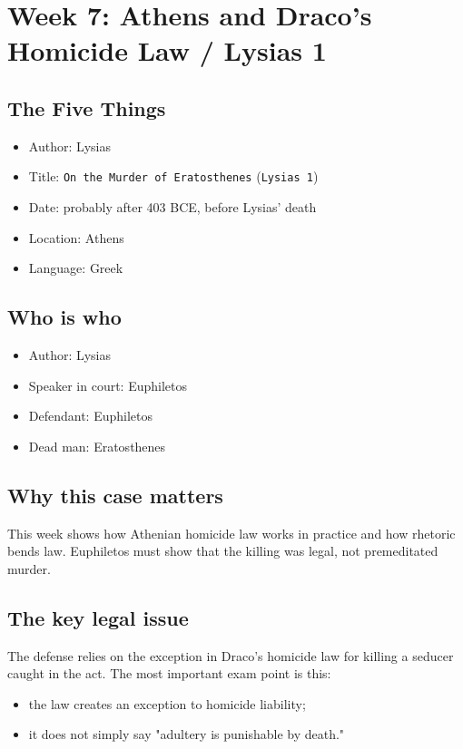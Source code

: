 \documentclass[11pt]{article}
\begin{document}
\section{Week 7: Athens and Draco's Homicide Law / Lysias 1}

\subsection{The Five Things}

\begin{itemize}
\item Author: Lysias
\item Title: \texttt{On the Murder of Eratosthenes} (\texttt{Lysias 1})
\item Date: probably after 403 BCE, before Lysias' death
\item Location: Athens
\item Language: Greek
\end{itemize}

\subsection{Who is who}

\begin{itemize}
\item Author: Lysias
\item Speaker in court: Euphiletos
\item Defendant: Euphiletos
\item Dead man: Eratosthenes
\end{itemize}

\subsection{Why this case matters}

This week shows how Athenian homicide law works in practice and how rhetoric bends law. Euphiletos must show that the killing was legal, not premeditated murder.

\subsection{The key legal issue}

The defense relies on the exception in Draco's homicide law for killing a seducer caught in the act. The most important exam point is this:

\begin{itemize}
\item the law creates an exception to homicide liability;
\item it does not simply say "adultery is punishable by death."
\end{itemize}
\end{document}
